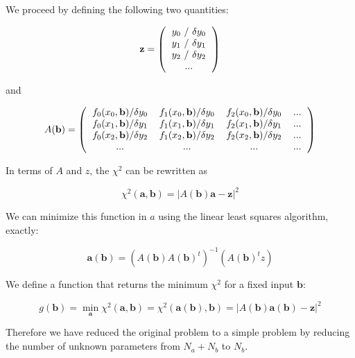 \documentclass[justified, sixbynine]{tufte-book}
\theoremstyle{plain}%
\newtheorem * {corollary}{Corollary}
\theoremstyle{definition}
\theoremstyle{remark}
\newtheorem * {remark}{Remark}
\newtheorem * {note}{Note}
\begin{document}
\begin{fullwidth}
We proceed by defining the following two quantities:

\begin{equation}
\mathbf{z} = \left(
\begin{tabular}{c}
$y_0$ / $\delta y_0$ \\
$y_1$ / $\delta y_1$ \\
$y_2$ / $\delta y_2$ \\
...
\end{tabular}
\right)
\end{equation}

and

\begin{equation}
A(\mathbf{b}) = \left(
\begin{tabular}{cccc}
$f_0(x_0, \mathbf{b})/\delta y_0$ &
$f_1(x_0, \mathbf{b})/\delta y_0$ &
$f_2(x_0, \mathbf{b})/\delta y_0$ & ... \\
$f_0(x_1, \mathbf{b})/\delta y_1$ &
$f_1(x_1, \mathbf{b})/\delta y_1$ &
$f_2(x_1, \mathbf{b})/\delta y_1$ & ... \\
$f_0(x_2, \mathbf{b})/\delta y_2$ &
$f_1(x_2, \mathbf{b})/\delta y_2$ &
$f_2(x_2, \mathbf{b})/\delta y_2$ & ... \\
... & ... & ... & ...
\end{tabular}
\right)
\end{equation}

In terms of $A$ and $z$, the $\chi^2$ can be rewritten as

\begin{equation}
\chi^2(\mathbf{a}, \mathbf{b}) = \left| A(\mathbf{b}) \mathbf{a} - \mathbf{z} \right|^2
\end{equation}

We can minimize this function in $a$ using the linear least squares algorithm, exactly:

\begin{equation}
\mathbf{a}(\mathbf{b}) = (A(\mathbf{b}) A(\mathbf{b})^t)^{-1}(A(\mathbf{b})^t z)
\end{equation}

We define a function that returns the minimum $\chi^2$ for a fixed input $\mathbf{b}$:

\begin{equation}
g(\mathbf{b}) =
\min_{\mathbf{a}}
\chi^2(\mathbf{a}, \mathbf{b}) =
\chi^2(\mathbf{a}(\mathbf{b}), \mathbf{b}) = \left|
A(\mathbf{b})\mathbf{a}(\mathbf{b}) - \mathbf{z}
\right|^2
\end{equation}

Therefore we have reduced the original problem to a simple problem by reducing the number of unknown parameters from $N_a+N_b$ to $N_b$.


\end{fullwidth}
\end{document}
